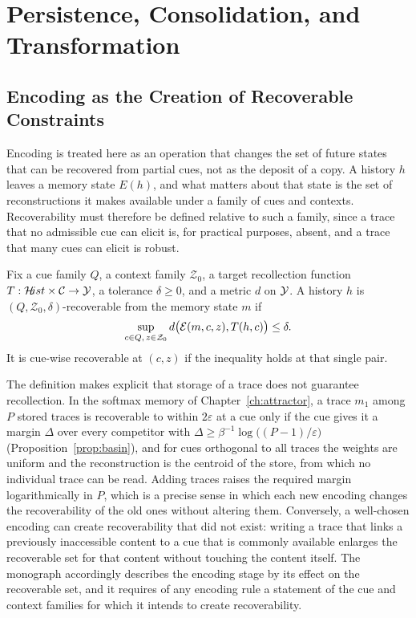 \part{Persistence, Consolidation, and Transformation}

\chapter{Encoding as the Creation of Recoverable Constraints}\label{ch:encoding}

Encoding is treated here as an operation that changes the set of future states that can be recovered from partial cues, not as the deposit of a copy. A history $h$ leaves a memory state $E(h)$, and what matters about that state is the set of reconstructions it makes available under a family of cues and contexts. Recoverability must therefore be defined relative to such a family, since a trace that no admissible cue can elicit is, for practical purposes, absent, and a trace that many cues can elicit is robust.

\begin{definition}[Recoverability]\label{def:recov}
Fix a cue family $Q$, a context family $\mathcal Z_0$, a target recollection function $T:\mathcal{H}\!ist\times\mathcal{C}\to\mathcal{Y}$, a tolerance $\delta\ge0$, and a metric $d$ on $\mathcal{Y}$. A history $h$ is $(Q,\mathcal Z_0,\delta)$-recoverable from the memory state $m$ if
\begin{equation}
\sup_{c\in Q,\,z\in\mathcal Z_0}d\bigl(\mathcal{E}(m,c,z),T(h,c)\bigr)\le\delta.
\end{equation}
It is cue-wise recoverable at $(c,z)$ if the inequality holds at that single pair.
\end{definition}

The definition makes explicit that storage of a trace does not guarantee recollection. In the softmax memory of Chapter~\ref{ch:attractor}, a trace $m_1$ among $P$ stored traces is recoverable to within $2\varepsilon$ at a cue only if the cue gives it a margin $\Delta$ over every competitor with $\Delta\ge\beta^{-1}\log\bigl((P-1)/\varepsilon\bigr)$ (Proposition~\ref{prop:basin}), and for cues orthogonal to all traces the weights are uniform and the reconstruction is the centroid of the store, from which no individual trace can be read. Adding traces raises the required margin logarithmically in $P$, which is a precise sense in which each new encoding changes the recoverability of the old ones without altering them. Conversely, a well-chosen encoding can create recoverability that did not exist: writing a trace that links a previously inaccessible content to a cue that is commonly available enlarges the recoverable set for that content without touching the content itself. The monograph accordingly describes the encoding stage by its effect on the recoverable set, and it requires of any encoding rule a statement of the cue and context families for which it intends to create recoverability.

